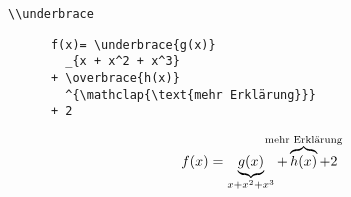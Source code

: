 \begin{frame}[fragile]{\lstinline+\\underbrace+}
  \begin{CodeExample}{0.58}
    \begin{lstlisting}
      f(x)= \underbrace{g(x)}
        _{x + x^2 + x^3}
      + \overbrace{h(x)}
        ^{\mathclap{\text{mehr Erklärung}}}
      + 2
    \end{lstlisting}
  \CodeResult
    \begin{equation*}
      f(x)= \underbrace{g(x)}_{x + x^2 + x^3}
      + \overbrace{h(x)}^{
        \mathclap{\text{mehr Erklärung}}
      } + 2
    \end{equation*}
  \end{CodeExample}
\end{frame}

